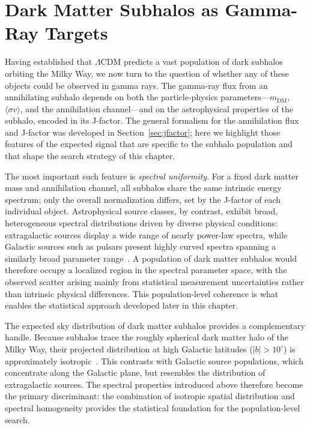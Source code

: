 ﻿%

\section{Dark Matter Subhalos as Gamma-Ray Targets}
\label{sec:5.3}

Having established that $\Lambda$CDM predicts a vast population of dark subhalos orbiting the Milky Way, we now turn to the question of whether any of these objects could be observed in gamma rays.
The gamma-ray flux from an annihilating subhalo depends on both the particle-physics parameters---$m_\mathrm{DM}$, $\langle\sigma v\rangle$, and the annihilation channel---and on the astrophysical properties of the subhalo, encoded in its J-factor.
The general formalism for the annihilation flux and J-factor was developed in Section~\ref{sec:jfactor}; here we highlight those features of the expected signal that are specific to the subhalo population and that shape the search strategy of this chapter.

The most important such feature is \emph{spectral uniformity}.
For a fixed dark matter mass and annihilation channel, all subhalos share the same intrinsic energy spectrum; only the overall normalization differs, set by the J-factor of each individual object.
Astrophysical source classes, by contrast, exhibit broad, heterogeneous spectral distributions driven by diverse physical conditions: extragalactic sources display a wide range of nearly power-law spectra, while Galactic sources such as pulsars present highly curved spectra spanning a similarly broad parameter range~\cite{Fermi-LAT:2022byn}.
A population of dark matter subhalos would therefore occupy a localized region in the spectral parameter space, with the observed scatter arising mainly from statistical measurement uncertainties rather than intrinsic physical differences.
This population-level coherence is what enables the statistical approach developed later in this chapter.

The expected sky distribution of dark matter subhalos provides a complementary handle.
Because subhalos trace the roughly spherical dark matter halo of the Milky Way, their projected distribution at high Galactic latitudes ($|b| > 10^\circ$) is approximately isotropic~\cite{2019JCAP...07..020C,2019JCAP...11..045C}.
This contrasts with Galactic source populations, which concentrate along the Galactic plane, but resembles the distribution of extragalactic sources.
The spectral properties introduced above therefore become the primary discriminant: the combination of isotropic spatial distribution and spectral homogeneity provides the statistical foundation for the population-level search.

